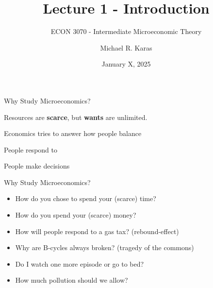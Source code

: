 \documentclass[12pt,t]{beamer}
\author{Michael R. Karas}
\title{Lecture 1 - Introduction}
\subtitle{ECON 3070 - Intermediate Microeconomic Theory}
\date{January X, 2025}
\begin{document}
\begin{frame}
  \titlepage
\end{frame}

\begin{frame}{Why Study Microeconomics?}
  \begin{center}
    Resources are \textbf{scarce}, but \textbf{wants} are unlimited.
  \end{center}

  \pause\bigskip
  \begin{center}
    Economics tries to answer how people balance 
  \end{center}

  \pause\bigskip
  \begin{center}
    People respond to 
  \end{center}

  \pause\bigskip
  \begin{center}
    People make decisions 
  \end{center}
\end{frame}

\begin{frame}{Why Study Microeconomics?}
  \begin{itemize}
    \item How do you chose to spend your (scarce) time? 
    \item How do you spend your (scarce) money?
  \end{itemize}
  
  \pause\bigskip
  \begin{itemize}
    \item How will people respond to a gas tax? (rebound-effect) 
    \item Why are B-cycles always broken? (tragedy of the commons)
  \end{itemize}
  
  \pause\bigskip
  \begin{itemize}
    \item Do I watch one more episode or go to bed? 
    \item How much pollution should we allow?
  \end{itemize}
\end{frame}
\end{document}
